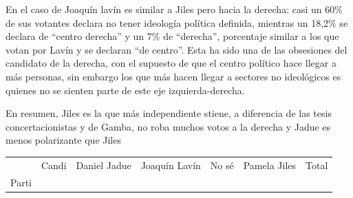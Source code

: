 \documentclass[
]{article}
\begin{document}
En el caso de Joaquín lavín es similar a Jiles pero hacia la derecha:
casi un 60\% de sus votantes declara no tener ideología política
definida, mientras un 18,2\% se declara de ``centro derecha'' y un 7\%
de ``derecha'', porcentaje similar a los que votan por Lavín y se
declaran ``de centro''. Esta ha sido una de las obsesiones del candidato
de la derecha, con el supuesto de que el centro político hace llegar a
más personas, sin embargo los que más hacen llegar a sectores no
ideológicos es quienes no se sienten parte de este eje
izquierda-derecha.

En resumen, Jiles es la que más independiente stiene, a diferencia de
las tesis concertacionistas y de Gamba, no roba muchos votos a la
derecha y Jadue es menos polarizante que Jiles

\begin{longtable}[]{@{}rrrrrrr@{}}
\toprule
\endhead
\begin{minipage}[t]{0.12\columnwidth}\raggedleft
\strut
\end{minipage} & \begin{minipage}[t]{0.06\columnwidth}\raggedleft
Candi\strut
\end{minipage} & \begin{minipage}[t]{0.13\columnwidth}\raggedleft
Daniel Jadue\strut
\end{minipage} & \begin{minipage}[t]{0.12\columnwidth}\raggedleft
Joaquín Lavín\strut
\end{minipage} & \begin{minipage}[t]{0.13\columnwidth}\raggedleft
No sé\strut
\end{minipage} & \begin{minipage}[t]{0.13\columnwidth}\raggedleft
Pamela Jiles\strut
\end{minipage} & \begin{minipage}[t]{0.13\columnwidth}\raggedleft
Total\strut
\end{minipage}\tabularnewline
\begin{minipage}[t]{0.12\columnwidth}\raggedleft
Parti\strut
\end{minipage} & \begin{minipage}[t]{0.06\columnwidth}\raggedleft
\strut
\end{minipage} & \begin{minipage}[t]{0.13\columnwidth}\raggedleft
\strut
\end{minipage} & \begin{minipage}[t]{0.12\columnwidth}\raggedleft

\end{minipage}
\end{longtable}
\end{document}
